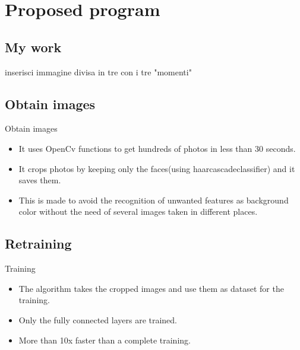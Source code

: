 \documentclass{beamer}
\begin{document}
\section{Proposed program}

\subsection{My work}

\begin{frame}
inserisci immagine divisa in tre con i tre "momenti"
\end{frame}

\subsection{Obtain images}

\begin{frame}{Obtain images}
	\begin{itemize}
		\setlength\itemsep{1em}
		[triangle]

			\item 
				It uses OpenCv functions to get hundreds of photos in less than 30 seconds.
			\item 
				It crops photos by keeping only the faces(using haarcascadeclassifier) and it saves them.
			\item
				This is made to avoid the recognition of unwanted features as background color without 							the need of several images taken in different places.
		
	\end{itemize}
\end{frame}

\subsection{Retraining}

\begin{frame}{Training}
\begin{itemize}
		\setlength\itemsep{1em}
		[triangle]
		
			\item 
				The algorithm takes the cropped images and use them as dataset for the training.
			\item 
				Only the fully connected layers are trained.
			\item
				More than 10x faster than a complete training.
		
	\end{itemize}
\end{frame}
\end{document}
